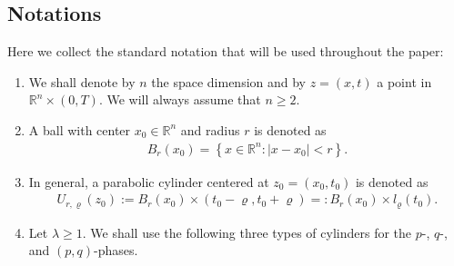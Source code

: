 \documentclass[11pt,oneside, english,reqno,twoside a4paper]{amsart}
\theoremstyle{definition}
\numberwithin{theorem}{section}
\numberwithin{equation}{section}
\newcommand{\RR}{\mathbb{R}}
\newcommand{\Rn}{{\mathbb{R}^{n}}}
\begin{document}
\subsection{Notations}\label{Subsec:Notation}
Here we collect the standard notation that will be used throughout the paper:
\begin{enumerate}[label=(\roman*),series=theoremconditions]
\item \label{not1} We shall denote by $n$ the space dimension and by $z=(x,t)$ a point in $ \Rn\times (0,T)$. We will always assume that $n \geq 2$.   
\item\label{not2} A ball with center $x_0 \in \mathbb{R}^n$ and radius $r$ is denoted as
 \begin{align*}
     B_r(x_0)=\left\{x \in \Rn : |x-x_0|<r\right\}.
 \end{align*}
\item\label{general cylinder} In general, a parabolic cylinder centered at $z_0=(x_0, t_0)$ is denoted as 
\begin{align*}
    U_{r, \varrho}(z_0):=B_r(x_0)\times \left(t_0-\varrho, t_0+\varrho\right)=:B_r(x_0)\times l_{\varrho}(t_0).
\end{align*}
\item\label{not5} Let $\lambda\geq 1.$ We shall use the following three types of cylinders for the $p$-, $q$-, and $(p, q)$-phases. 


\end{enumerate}
\end{document}
